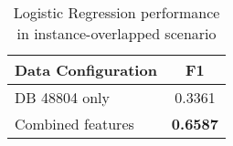 \begin{table}[ht]
  \centering
  \caption{Logistic Regression performance in instance-overlapped scenario}
  \label{tab:vfl_logistic_regression_prediction_results}
  \begin{tabular}{lc}
  \toprule
  \textbf{Data Configuration} & \textbf{F1} \\
  \midrule
  DB 48804 only & 0.3361 \\
  Combined features & \textbf{0.6587} \\
  \bottomrule
  \end{tabular}
  \end{table}
